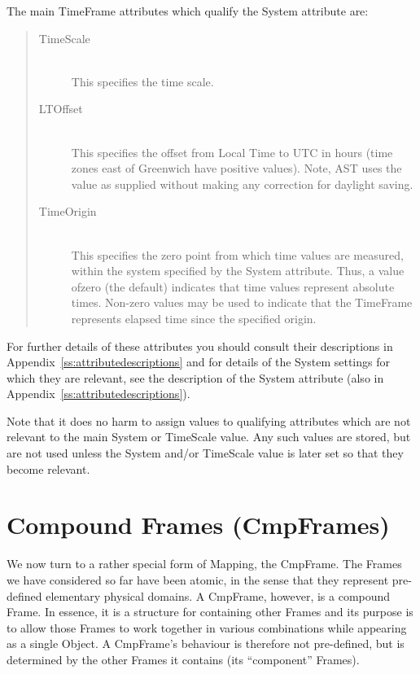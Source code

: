\documentclass[twoside,11pt]{article}
\newcommand{\appref}[1]{Appendix~\ref{#1}}
\newcommand{\appref}[1]{\ref{#1}}
\begin{document}
The main TimeFrame attributes which qualify the System attribute are:

\begin{quote}
\begin{description}

\item[TimeScale]\mbox{}\\
This specifies the time scale.

\item[LTOffset]\mbox{}\\
This specifies the offset from Local Time to UTC in hours (time zones
east of Greenwich have positive values). Note, AST uses the value as
supplied without making any correction for daylight saving.

\item[TimeOrigin]\mbox{}\\
This specifies the zero point from which time values are measured, within
the system specified by the System attribute. Thus, a value ofzero (the
default) indicates that time values represent absolute times. Non-zero
values may be used to indicate that the TimeFrame represents elapsed time
since the specified origin.

\end{description}
\end{quote}

For further details of these attributes you should consult their
descriptions in \appref{ss:attributedescriptions} and for details of
the System settings for which they are relevant, see the description
of the System attribute (also in \appref{ss:attributedescriptions}).

Note that it does no harm to assign values to qualifying attributes
which are not relevant to the main System or TimeScale value. Any such 
values are stored, but are not used unless the System and/or TimeScale 
value is later set so that they become relevant.

\cleardoublepage
\section{\label{ss:cmpframes}Compound Frames (CmpFrames)}

We now turn to a rather special form of Mapping, the CmpFrame. The
Frames we have considered so far have been atomic, in the sense that
they represent pre-defined elementary physical domains. A CmpFrame,
however, is a compound Frame. In essence, it is a structure for
containing other Frames and its purpose is to allow those Frames
to work together in various combinations while appearing as a single
Object. A CmpFrame's behaviour is therefore not pre-defined, but is
determined by the other Frames it contains (its ``component'' Frames).
\end{document}
